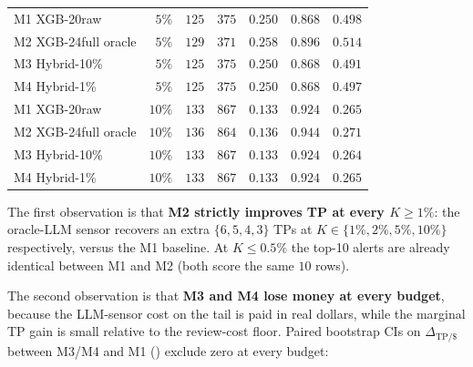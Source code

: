 \begin{table}[t]
\begin{tabular}{lrrrrrr}
\midrule
M1 XGB-20raw           & $5\%$   & $125$ & $375$ & $0.250$ & $0.868$ & $0.498$ \\
M2 XGB-24full oracle   & $5\%$   & $129$ & $371$ & $0.258$ & $0.896$ & $0.514$ \\
M3 Hybrid-10\%         & $5\%$   & $125$ & $375$ & $0.250$ & $0.868$ & $0.491$ \\
M4 Hybrid-1\%          & $5\%$   & $125$ & $375$ & $0.250$ & $0.868$ & $0.497$ \\
\midrule
M1 XGB-20raw           & $10\%$  & $133$ & $867$ & $0.133$ & $0.924$ & $0.265$ \\
M2 XGB-24full oracle   & $10\%$  & $136$ & $864$ & $0.136$ & $0.944$ & $0.271$ \\
M3 Hybrid-10\%         & $10\%$  & $133$ & $867$ & $0.133$ & $0.924$ & $0.264$ \\
M4 Hybrid-1\%          & $10\%$  & $133$ & $867$ & $0.133$ & $0.924$ & $0.265$ \\
\bottomrule
\end{tabular}
\end{table}

The first observation is that \textbf{M2 strictly improves TP at every
$K \ge 1\%$}: the oracle-LLM sensor recovers an extra
$\{6, 5, 4, 3\}$ TPs at $K \in \{1\%, 2\%, 5\%, 10\%\}$ respectively,
versus the M1 baseline. At $K \le 0.5\%$ the top-10 alerts are already
identical between M1 and M2 (both score the same $10$ rows).

The second observation is that \textbf{M3 and M4 lose money at every
budget}, because the LLM-sensor cost on the tail is paid in real
dollars, while the marginal TP gain is small relative to the review-cost
floor. Paired bootstrap CIs on $\Delta_{\text{TP}/\$}$ between M3/M4 and
M1 () exclude zero at every
budget:

